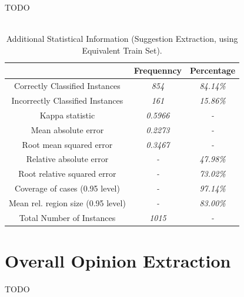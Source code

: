 TODO\\
\\

\begin{table}[H]
\centering
\caption{Additional Statistical Information (Suggestion Extraction, using Equivalent Train Set).}
\label{412_table_rer}
\begin{tabular}{ccc}
\hline
                                   & {\bf Frequenncy} & {\bf Percentage} \\ \hline
Correctly Classified Instances     & {\it 854}        & {\it 84.14\%}    \\
Incorrectly Classified Instances   & {\it 161}        & {\it 15.86\%}    \\
Kappa statistic                    & {\it 0.5966}     & {\it -}          \\
Mean absolute error                & {\it 0.2273}     & {\it -}          \\
Root mean squared error            & {\it 0.3467}     & {\it -}          \\
Relative absolute error            & {\it -}          & {\it 47.98\%}    \\
Root relative squared error        & {\it -}          & {\it 73.02\%}    \\
Coverage of cases (0.95 level)     & {\it -}          & {\it 97.14\%}    \\
Mean rel. region size (0.95 level) & {\it -}          & {\it 83.00\%}    \\
Total Number of Instances          & {\it 1015}       & {\it -}          \\ \hline
\end{tabular}
\end{table}


\section{Overall Opinion Extraction}\label{43_ref}
TODO\\
\\

